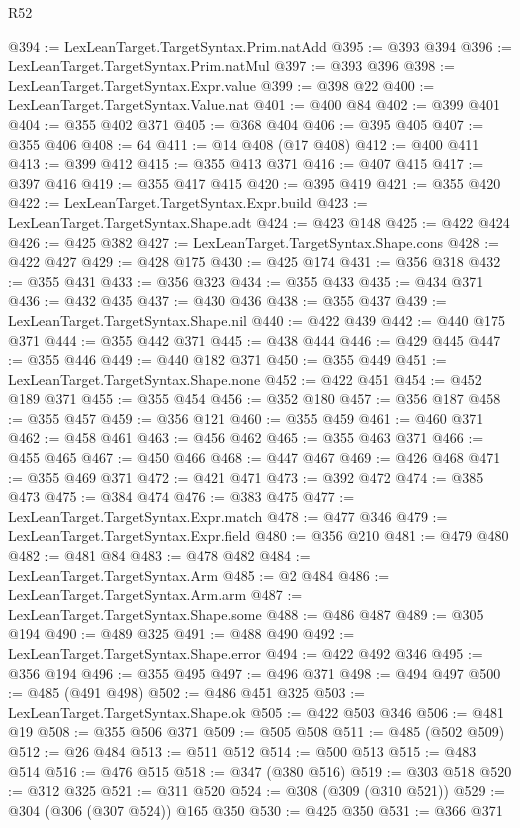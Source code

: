 \begin{lexlean}{R52}
\begin{coremodule}
@394 := LexLeanTarget.TargetSyntax.Prim.natAdd
@395 := @393 @394
@396 := LexLeanTarget.TargetSyntax.Prim.natMul
@397 := @393 @396
@398 := LexLeanTarget.TargetSyntax.Expr.value
@399 := @398 @22
@400 := LexLeanTarget.TargetSyntax.Value.nat
@401 := @400 @84
@402 := @399 @401
@404 := @355 @402 @371
@405 := @368 @404
@406 := @395 @405
@407 := @355 @406
@408 := 64
@411 := @14 @408 (@17 @408)
@412 := @400 @411
@413 := @399 @412
@415 := @355 @413 @371
@416 := @407 @415
@417 := @397 @416
@419 := @355 @417 @415
@420 := @395 @419
@421 := @355 @420
@422 := LexLeanTarget.TargetSyntax.Expr.build
@423 := LexLeanTarget.TargetSyntax.Shape.adt
@424 := @423 @148
@425 := @422 @424
@426 := @425 @382
@427 := LexLeanTarget.TargetSyntax.Shape.cons
@428 := @422 @427
@429 := @428 @175
@430 := @425 @174
@431 := @356 @318
@432 := @355 @431
@433 := @356 @323
@434 := @355 @433
@435 := @434 @371
@436 := @432 @435
@437 := @430 @436
@438 := @355 @437
@439 := LexLeanTarget.TargetSyntax.Shape.nil
@440 := @422 @439
@442 := @440 @175 @371
@444 := @355 @442 @371
@445 := @438 @444
@446 := @429 @445
@447 := @355 @446
@449 := @440 @182 @371
@450 := @355 @449
@451 := LexLeanTarget.TargetSyntax.Shape.none
@452 := @422 @451
@454 := @452 @189 @371
@455 := @355 @454
@456 := @352 @180
@457 := @356 @187
@458 := @355 @457
@459 := @356 @121
@460 := @355 @459
@461 := @460 @371
@462 := @458 @461
@463 := @456 @462
@465 := @355 @463 @371
@466 := @455 @465
@467 := @450 @466
@468 := @447 @467
@469 := @426 @468
@471 := @355 @469 @371
@472 := @421 @471
@473 := @392 @472
@474 := @385 @473
@475 := @384 @474
@476 := @383 @475
@477 := LexLeanTarget.TargetSyntax.Expr.match
@478 := @477 @346
@479 := LexLeanTarget.TargetSyntax.Expr.field
@480 := @356 @210
@481 := @479 @480
@482 := @481 @84
@483 := @478 @482
@484 := LexLeanTarget.TargetSyntax.Arm
@485 := @2 @484
@486 := LexLeanTarget.TargetSyntax.Arm.arm
@487 := LexLeanTarget.TargetSyntax.Shape.some
@488 := @486 @487
@489 := @305 @194
@490 := @489 @325
@491 := @488 @490
@492 := LexLeanTarget.TargetSyntax.Shape.error
@494 := @422 @492 @346
@495 := @356 @194
@496 := @355 @495
@497 := @496 @371
@498 := @494 @497
@500 := @485 (@491 @498)
@502 := @486 @451 @325
@503 := LexLeanTarget.TargetSyntax.Shape.ok
@505 := @422 @503 @346
@506 := @481 @19
@508 := @355 @506 @371
@509 := @505 @508
@511 := @485 (@502 @509)
@512 := @26 @484
@513 := @511 @512
@514 := @500 @513
@515 := @483 @514
@516 := @476 @515
@518 := @347 (@380 @516)
@519 := @303 @518
@520 := @312 @325
@521 := @311 @520
@524 := @308 (@309 (@310 @521))
@529 := @304 (@306 (@307 @524)) @165 @350
@530 := @425 @350
@531 := @366 @371

\end{coremodule}
\end{lexlean}

